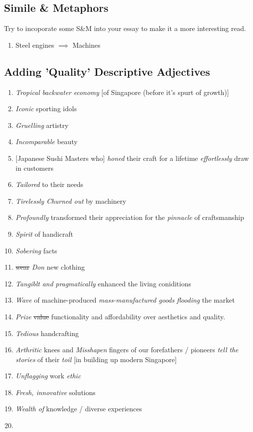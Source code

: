 \documentclass[oneside]{book}
\begin{document}
\subsection{Simile \& Metaphors}
Try to incoporate some S\&M into your essay to make it a more interesting read.
\begin{enumerate}
    \item Steel engines \( \implies \) Machines
\end{enumerate}
\subsection{Adding 'Quality' Descriptive Adjectives}
\begin{enumerate}
    \item \emph{Tropical backwater economy} [of Singapore (before it's spurt of growth)]
    \item \emph{Iconic} sporting idols
    \item \emph{Gruelling} artistry
    \item \emph{Incomparable} beauty
    \item \small [Japanese Sushi Masters who] \normalsize \emph{honed} their craft for a lifetime \emph{effortlessly} draw in customers
    \item \emph{Tailored} to their needs
    \item \emph{Tirelessly Churned out} by machinery
    \item \emph{Profoundly} transformed their appreciation for the \emph{pinnacle} of craftsmanship
    \item \emph{Spirit} of handicraft
    \item \emph{Sobering} facts
    \item \st{wear} \emph{Don} new clothing
    \item \emph{Tangiblt and pragmatically} enhanced the living coniditions
    \item \emph{Wave} of machine-produced \emph{mass-manufactured goods} \emph{flooding} the market
    \item \emph{Prize} \st{value} functionality and affordability over aesthetics and quality.
    \item \emph{Tedious} handcrafting
    \item \emph{Arthritic} knees and \emph{Misshapen} fingers of our forefathers / pioneers \emph{tell the stories} of their \emph{toil} [in building up modern Singapore]
    \item \emph{Unflagging} work \emph{ethic}
    \item \emph{Fresh, innovative} solutions
    \item \emph{Wealth of} knowledge / diverse experiences
    \item 
\end{enumerate}
\end{document}
